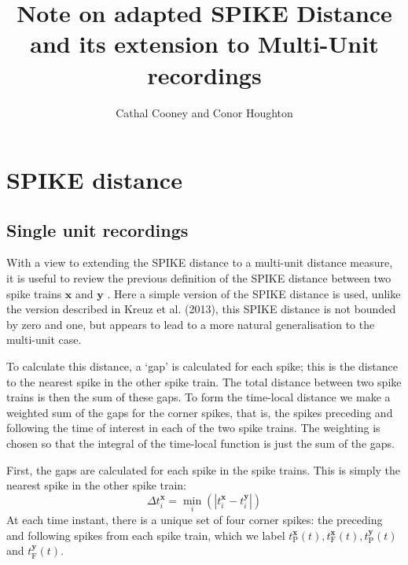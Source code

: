 \documentclass[11pt]{amsart}
\title{Note on adapted SPIKE Distance and its extension to Multi-Unit recordings}
\author{Cathal Cooney and Conor Houghton}
\begin{document}
\maketitle
\section{SPIKE distance}

\subsection{Single unit recordings}


With a view to extending the SPIKE distance to a multi-unit distance measure, it is useful to review the previous definition of the SPIKE distance between two spike trains $\mathbf{x}$ and $\mathbf{y}$ .  Here a simple version of the SPIKE distance is used, unlike the version described in Kreuz et al. (2013), this SPIKE distance is not bounded by zero and one, but appears to lead to a more natural generalisation to the multi-unit case.
\bigskip

To calculate this distance, a \lq{}gap\rq{} is calculated for each spike; this is the distance to the nearest spike in the other spike train. The total distance between two spike trains is then the sum of these gaps. To form the time-local distance we make a weighted sum of the gaps for the corner spikes, that is, the spikes preceding and following the time of interest in each of the two spike trains. The weighting is chosen so that the integral of the time-local function is just the sum of the gaps.

First, the gaps are calculated for each spike in the spike trains.  This is simply the nearest spike in the other spike train:
\begin{equation}
\Delta t_{i}^{\mathbf{x}} = \min_{i} \left( | t_{i}^{\mathbf{x}} - t_i^{\mathbf{y}} | \right)
\end{equation}
 At each time instant, there is a unique set of four corner spikes: the preceding and following spikes from each spike train, which we label $t_{\mathrm{P}}^{\mathbf{x}}(t) ,t_{\mathrm{F}}^{\mathbf{x}}(t) ,t_{\mathrm{P}}^{\mathbf{y}}(t)$ and $t_{\mathrm{F}}^{\mathbf{y}}(t)$.
\bigskip
\end{document}
